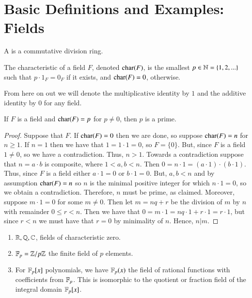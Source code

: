 \chapter{ Basic Definitions and Examples: Fields}
\label{FieldDefs}


\begin{definition}
    A  is a commutative division ring.
\end{definition}


\begin{definition}
    The characteristic of a field $F$, denoted $\operatorname{char}(F)$, is the smallest $p \in \mathbb N = \{1,2,...\}$ such that $p\cdot 1_F = 0_F$ if it exists, and $\operatorname{char}(F) = 0$, otherwise.
\end{definition}

From here on out we will denote the multiplicative identity by $1$ and the additive identity by $0$ for any field.

\begin{remark}
    If $F$ is a field and $\operatorname{char}(F) = p$ for $p \neq 0$, then $p$ is a prime.
\end{remark}
\begin{proof}
    Suppose that $F$. If $\operatorname{char}(F) = 0$ then we are done, so suppose $\operatorname{char}(F) = n$ for $n \geq 1$. If $n = 1$ then we have that $1 = 1\cdot 1 = 0$, so $F = \{0\}$. But, since $F$ is a field $1 \neq 0$, so we have a contradiction. Thus, $n > 1$. Towards a contradiction suppose that $n = a\cdot b$ is composite, where $1 < a,b < n$. Then $0 = n\cdot 1 = (a\cdot 1)\cdot (b\cdot 1)$. Thus, since $F$ is a field either $a\cdot 1 = 0$ or $b \cdot 1 = 0$. But, $a,b < n$ and by assumption $\operatorname{char}(F) = n$ so $n$ is the minimal positive integer for which $n\cdot 1 = 0$, so we obtain a contradiction. Therefore, $n$ must be prime, as claimed. Moreover, suppose $m \cdot 1 = 0$ for some $m \neq 0$. Then let $m = nq + r$ be the division of $m$ by $n$ with remainder $0\leq r<n$. Then we have that $0 = m\cdot 1 = nq\cdot 1 + r\cdot 1 = r\cdot 1$, but since $r < n$ we must have that $r = 0$ by minimality of $n$. Hence, $n \vert m$.
\end{proof}

\begin{example}
    \leavevmode
    \begin{enumerate}
        \item $\mathbb R, \mathbb Q, \mathbb C$, fields of characteristic zero.
        \item $\mathbb F_p = \mathbb Z/p\mathbb Z$ the finite field of $p$ elements.
        \item For $\mathbb F_p[x]$ polynomials, we have $\mathbb F_p(x)$ the field of rational functions with coefficients from $\mathbb F_p$. This is isomorphic to the quotient or fraction field of the integral domain $\mathbb F_p[x]$.
    \end{enumerate}
\end{example}

